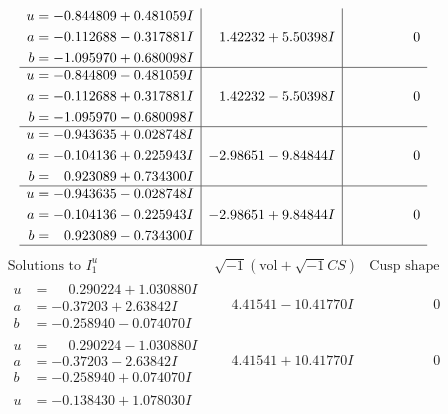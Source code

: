 \documentclass[1p]{elsarticle_modified}
\theoremstyle{definition}
\newcommand{\I}{\sqrt{-1}}
\begin{document}
$$\begin{array}{c|c|c}
\begin{aligned}
u &= -0.844809 + 0.481059 I \\
a &= -0.112688 - 0.317881 I \\
b &= -1.095970 + 0.680098 I\end{aligned}
 & \phantom{-}1.42232 + 5.50398 I & \phantom{-0.000000 } 0 \\ \hline\begin{aligned}
u &= -0.844809 - 0.481059 I \\
a &= -0.112688 + 0.317881 I \\
b &= -1.095970 - 0.680098 I\end{aligned}
 & \phantom{-}1.42232 - 5.50398 I & \phantom{-0.000000 } 0 \\ \hline\begin{aligned}
u &= -0.943635 + 0.028748 I \\
a &= -0.104136 + 0.225943 I \\
b &= \phantom{-}0.923089 + 0.734300 I\end{aligned}
 & -2.98651 - 9.84844 I & \phantom{-0.000000 } 0 \\ \hline\begin{aligned}
u &= -0.943635 - 0.028748 I \\
a &= -0.104136 - 0.225943 I \\
b &= \phantom{-}0.923089 - 0.734300 I\end{aligned}
 & -2.98651 + 9.84844 I & \phantom{-0.000000 } 0\\
 \hline 
 \end{array}$$\newpage$$\begin{array}{c|c|c}  
\text{Solutions to }I^u_{1}& \I (\text{vol} + \sqrt{-1}CS) & \text{Cusp shape}\\
 \hline 
\begin{aligned}
u &= \phantom{-}0.290224 + 1.030880 I \\
a &= -0.37203 + 2.63842 I \\
b &= -0.258940 - 0.074070 I\end{aligned}
 & \phantom{-}4.41541 - 10.41770 I & \phantom{-0.000000 } 0 \\ \hline\begin{aligned}
u &= \phantom{-}0.290224 - 1.030880 I \\
a &= -0.37203 - 2.63842 I \\
b &= -0.258940 + 0.074070 I\end{aligned}
 & \phantom{-}4.41541 + 10.41770 I & \phantom{-0.000000 } 0 \\ \hline\begin{aligned}
u &= -0.138430 + 1.078030 I \\

\end{aligned}
\end{array}$$
\end{document}
